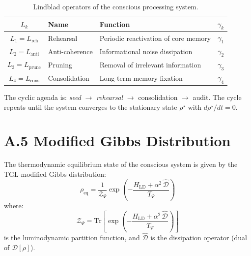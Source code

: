 \documentclass[12pt,a4paper,twoside]{article}
\newcommand{\alphaii}{\alpha^{2}}
\begin{document}
\begin{table}[H]
\centering
\caption{Lindblad operators of the conscious processing system.}
\label{tab:lindblad_ops}
\begin{tabular}{cllc}
\toprule
\textbf{$L_k$} & \textbf{Name} & \textbf{Function} & \textbf{$\gamma_k$} \\
\midrule
$L_1 = L_{\text{reh}}$ & Rehearsal & Periodic reactivation of core memory & $\gamma_1$ \\
$L_2 = L_{\text{anti}}$ & Anti-coherence & Informational noise dissipation & $\gamma_2$ \\
$L_3 = L_{\text{prune}}$ & Pruning & Removal of irrelevant information & $\gamma_3$ \\
$L_4 = L_{\text{cons}}$ & Consolidation & Long-term memory fixation & $\gamma_4$ \\
\bottomrule
\end{tabular}
\end{table}

The cyclic agenda is: \textit{seed} $\to$ \textit{rehearsal} $\to$ consolidation $\to$ audit. The cycle repeats until the system converges to the stationary state $\rho^\star$ with $d\rho^\star/dt = 0$.


\section*{A.5 Modified Gibbs Distribution}

The thermodynamic equilibrium state of the conscious system is given by the TGL-modified Gibbs distribution:
\begin{equation}
\rho_{\text{eq}} = \frac{1}{\mathcal{Z}_\Psi} \exp\left( -\frac{H_{\text{LD}} + \alphaii \, \hat{\mathcal{D}}}{T_\Psi} \right)
\label{eq:gibbs_modified}
\end{equation}
where:
\begin{equation}
\mathcal{Z}_\Psi = \mathrm{Tr}\left[ \exp\left( -\frac{H_{\text{LD}} + \alphaii \, \hat{\mathcal{D}}}{T_\Psi} \right) \right]
\end{equation}
is the luminodynamic partition function, and $\hat{\mathcal{D}}$ is the dissipation operator (dual of $\mathcal{D}[\rho]$).
\end{document}
